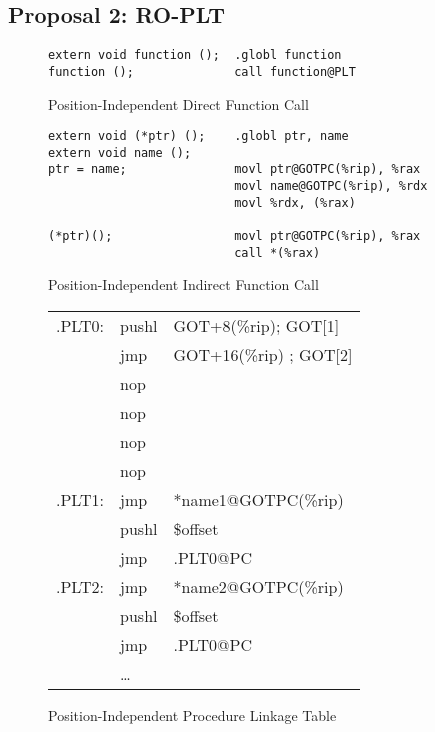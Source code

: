 
\subsection{Proposal 2: RO-PLT}



\begin{figure}[H]
\caption{Position-Independent Direct Function Call}
\begin{verbatim}
extern void function ();  .globl function
function ();              call function@PLT
\end{verbatim}
\end{figure}

\begin{figure}[H]
\caption{Position-Independent Indirect Function Call}
\begin{verbatim}
extern void (*ptr) ();    .globl ptr, name
extern void name ();
ptr = name;               movl ptr@GOTPC(%rip), %rax
                          movl name@GOTPC(%rip), %rdx
                          movl %rdx, (%rax)

(*ptr)();                 movl ptr@GOTPC(%rip), %rax
                          call *(%rax)
\end{verbatim}
\end{figure}

\begin{figure}[H]
\caption{Position-Independent Procedure Linkage Table}
\begin{tabular}{lll}
.PLT0: & pushl & GOT+8(\%rip); GOT[1]\\
& jmp &GOT+16(\%rip) ; GOT[2] \\
& nop & \\
& nop & \\
& nop & \\
& nop & \\
.PLT1: & jmp &*name1@GOTPC(\%rip)\\
& pushl & \$offset \\
&jmp &.PLT0@PC \\
.PLT2: & jmp&*name2@GOTPC(\%rip)\\
&pushl & \$offset \\
& jmp & .PLT0@PC \\
&\dots\\
\end{tabular}
\end{figure}

